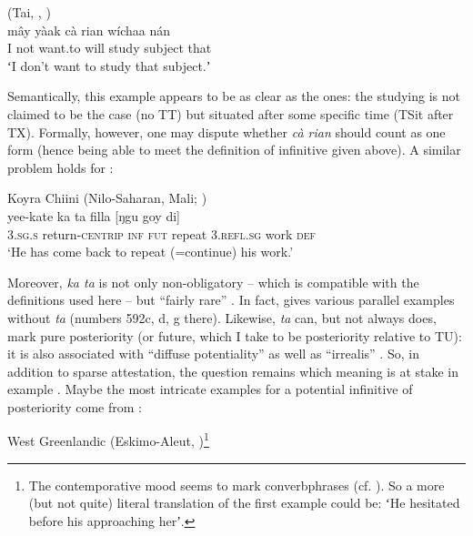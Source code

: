 \documentclass[output=paper,hidelinks]{langscibook}
\begin{document}
\ea\label{ex:reiner:8}  (Tai, \citealt[772]{Hudak1987}, \citealt[692]{Hudak2018})  \\
	{mây}	{yàak}		{cà	rian}	{wíchaa}	{nán}\\
I		not	want.to	will	study	subject	that  \\ 
\glt ʻI don’t want to study that subject.ʼ  \\ 
\z  

Semantically, this example appears to be as clear as the  ones: the studying is not claimed to be the case (no TT) but situated after some specific time (TSit after TX). Formally, however, one may dispute whether \emph{cà rian} should count as one form (hence being able to meet the definition of infinitive given above).
A similar problem holds for  :

\ea\label{ex:reiner:9} Koyra Chiini (Nilo-Saharan, Mali; \citealt[164]{Heath1999})\\ 
		{yee-kate}		{ka}	{ta}	{filla}   {[ŋgu}		{goy}		{di]}\\
\textsc{3.sg.s}    return-\textsc{centrip}  \textsc{inf} \textsc{fut} repeat  \textsc{3.refl.sg}	work    \textsc{def}\\
\glt ‘He has come back to repeat (=continue) his work.’\\
\z  

Moreover, \emph{ka ta} is not only non-obligatory \citep[163]{Heath1999} – which is compatible with the definitions used here – but “fairly rare” \citep[164]{Heath1999}. In fact, \citet[311]{Heath1999} gives various parallel examples without \emph{ta} (numbers 592c, d, g there). Likewise, \emph{ta} can, but not always does, mark pure posteriority (or future, which I take to be posteriority relative to TU): it is also associated with “diffuse potentiality” as well as “irrealis” \citep[163]{Heath1999}. So, in addition to sparse attestation, the question remains which meaning is at stake in example .
Maybe the most intricate examples for a potential infinitive of posteriority come from :


\ea\label{ex:reiner:10} West Greenlandic (Eskimo-Aleut, \citealt[276]{Fortescue1984})\footnote{The contemporative mood seems to mark converbphrases (cf. \citealt[3]{Haspelmath1995}). So a more (but not quite) literal translation of the first example could be: ʻHe hesitated before his approaching herʼ.}\\
 
\end{document}
